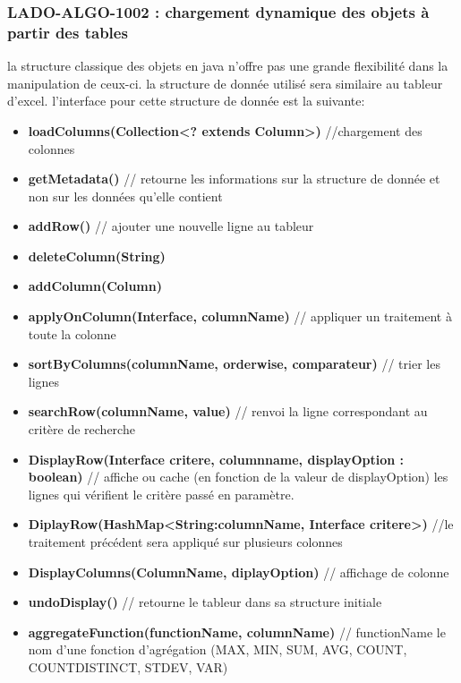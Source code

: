 \documentclass[12pt,a4paper]{report}
\begin{document}
\subsubsection{LADO-ALGO-1002 : chargement dynamique des objets à partir des tables}
la structure classique des objets en java n'offre pas une grande flexibilité dans la manipulation de ceux-ci. la structure de donnée utilisé sera similaire au tableur d'excel. l'interface pour cette structure de donnée est la suivante: 
\begin{itemize}
\item \textbf{loadColumns(Collection<? extends Column>)} //chargement des colonnes
\item \textbf{getMetadata()} // retourne les informations sur la structure de donnée et non sur les données qu'elle contient
\item \textbf{addRow()} // ajouter une nouvelle ligne au tableur 
\item \textbf{deleteColumn(String)} 
\item \textbf{addColumn(Column)}
\item \textbf{applyOnColumn(Interface, columnName)} // appliquer un traitement à toute la colonne 
\item \textbf{sortByColumns(columnName, orderwise, comparateur)} // trier les lignes 
\item \textbf{searchRow(columnName, value)} // renvoi la ligne correspondant au critère de recherche 
\item \textbf{DisplayRow(Interface critere, columnname, displayOption : boolean)} // affiche ou cache (en fonction de la valeur de displayOption) les lignes qui vérifient le critère passé en paramètre. 
\item \textbf{DiplayRow(HashMap<String:columnName, Interface critere>)} //le traitement précédent sera appliqué sur plusieurs colonnes
\item \textbf{DisplayColumns(ColumnName, diplayOption)} // affichage de colonne
\item \textbf{undoDisplay()} // retourne le tableur dans sa structure initiale
\item \textbf{aggregateFunction(functionName, columnName)} // functionName le nom d'une fonction d'agrégation (MAX, MIN, SUM, AVG, COUNT, COUNTDISTINCT, STDEV, VAR) 
\end{itemize} 
\end{document}
